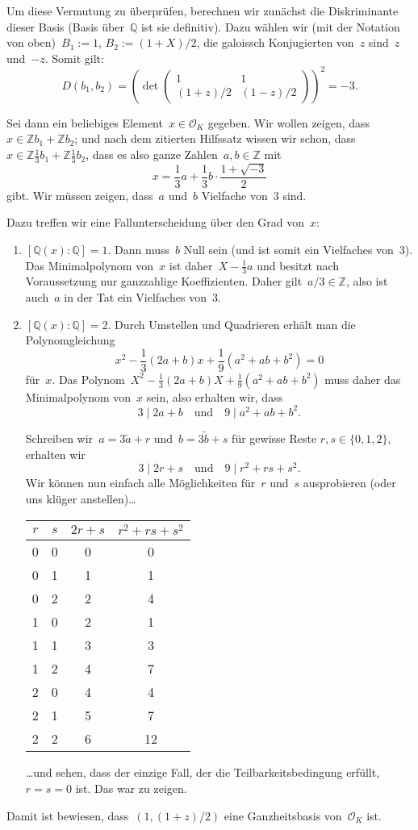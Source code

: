 \documentclass[12pt,a4paper,ngerman]{scrartcl}
\newcommand{\Q}{\mathbb{Q}}
\newcommand{\Z}{\mathbb{Z}}
\theoremstyle{definition}
\theoremstyle{plain}
\theoremstyle{remark}
\begin{document}
Um diese Vermutung zu überprüfen, berechnen wir zunächst die Diskriminante
dieser Basis (Basis über~$\Q$ ist sie definitiv). Dazu wählen wir (mit der
Notation von oben)~$B_1 := 1$, $B_2 := (1+X)/2$, die galoissch Konjugierten
von~$z$ sind~$z$ und~$-z$. Somit gilt:
\[ D(b_1,b_2) = \left(\operatorname{det} \begin{pmatrix}
  1 & 1 \\
  (1+z)/2 & (1-z)/2
\end{pmatrix}\right)^2 = -3. \]

Sei dann ein beliebiges Element~$x \in \mathcal{O}_K$ gegeben. Wir wollen
zeigen, dass~$x \in \Z b_1 + \Z b_2$; und nach dem zitierten Hilfssatz wissen
wir schon, dass~$x \in \Z \frac{1}{3} b_1 + \Z \frac{1}{3} b_2$, dass es also
ganze Zahlen~$a,b \in \Z$ mit
\[ x = \frac{1}{3}a + \frac{1}{3}b \cdot \frac{1+\sqrt{-3}}{2} \]
gibt. Wir müssen zeigen, dass~$a$ und~$b$ Vielfache von~$3$ sind.

Dazu treffen wir eine Fallunterscheidung über den Grad von~$x$:
\begin{enumerate}
\item $[\Q(x):\Q] = 1$. Dann muss~$b$ Null sein (und ist somit ein Vielfaches
von~3). Das Minimalpolynom von~$x$ ist daher~$X - \frac{1}{3}a$ und besitzt
nach Voraussetzung nur ganzzahlige Koeffizienten. Daher gilt~$a/3 \in \Z$, also
ist auch~$a$ in der Tat ein Vielfaches von~$3$.
\item $[\Q(x):\Q] = 2$. Durch Umstellen und Quadrieren erhält man die
Polynomgleichung
\[ x^2 - \frac{1}{3}(2a+b) x + \frac{1}{9}(a^2+ab+b^2) = 0 \]
für~$x$. Das Polynom~$X^2 - \frac{1}{3}(2a+b)X +
\frac{1}{9}(a^2+ab+b^2)$ muss daher das Minimalpolynom von~$x$ sein, also erhalten
wir, dass
\[ 3 \mathrel{|} 2a+b \quad\text{und}\quad 9 \mathrel{|} a^2+ab+b^2. \]

Schreiben wir~$a = 3\tilde a + r$ und~$b = 3\tilde b + s$ für gewisse Reste
$r,s \in \{ 0,1,2 \}$, erhalten wir
\[ 3 \mathrel{|} 2r+s \quad\text{und}\quad 9 \mathrel{|} r^2+rs+s^2. \]
Wir können nun einfach alle Möglichkeiten für~$r$ und~$s$ ausprobieren (oder
uns klüger anstellen)\ldots
\begin{center}
\begin{tabular}{cccc}
  $r$ & $s$ & $2r+s$ & $r^2+rs+s^2$ \\
  \hline
  0 & 0 & 0 & 0 \\
  0 & 1 & 1 & 1 \\
  0 & 2 & 2 & 4 \\
  1 & 0 & 2 & 1 \\
  1 & 1 & 3 & 3 \\
  1 & 2 & 4 & 7 \\
  2 & 0 & 4 & 4 \\
  2 & 1 & 5 & 7 \\
  2 & 2 & 6 & 12
\end{tabular}
\end{center}
\ldots und sehen, dass der einzige Fall, der die Teilbarkeitsbedingung erfüllt,
$r = s = 0$ ist. Das war zu zeigen.
\end{enumerate}
Damit ist bewiesen, dass~$(1, (1+z)/2)$ eine Ganzheitsbasis von~$\mathcal{O}_K$
ist.
\end{document}
